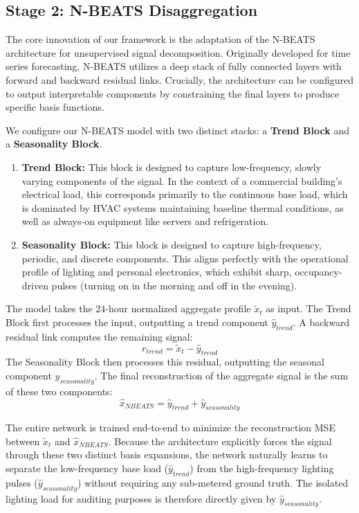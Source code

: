\subsection{Stage 2: N-BEATS Disaggregation}
The core innovation of our framework is the adaptation of the N-BEATS architecture \cite{nbeats_2020} for unsupervised signal decomposition. Originally developed for time series forecasting, N-BEATS utilizes a deep stack of fully connected layers with forward and backward residual links. Crucially, the architecture can be configured to output interpretable components by constraining the final layers to produce specific basis functions.

We configure our N-BEATS model with two distinct stacks: a \textbf{Trend Block} and a \textbf{Seasonality Block}.
\begin{enumerate}
    \item \textbf{Trend Block:} This block is designed to capture low-frequency, slowly varying components of the signal. In the context of a commercial building's electrical load, this corresponds primarily to the continuous base load, which is dominated by HVAC systems maintaining baseline thermal conditions, as well as always-on equipment like servers and refrigeration.
    \item \textbf{Seasonality Block:} This block is designed to capture high-frequency, periodic, and discrete components. This aligns perfectly with the operational profile of lighting and personal electronics, which exhibit sharp, occupancy-driven pulses (turning on in the morning and off in the evening).
\end{enumerate}

The model takes the 24-hour normalized aggregate profile $\tilde{x}_t$ as input. The Trend Block first processes the input, outputting a trend component $\hat{y}_{trend}$. A backward residual link computes the remaining signal:
\begin{equation}
    r_{trend} = \tilde{x}_t - \hat{y}_{trend}
\end{equation}
The Seasonality Block then processes this residual, outputting the seasonal component $\hat{y}_{seasonality}$. The final reconstruction of the aggregate signal is the sum of these two components:
\begin{equation}
    \hat{x}_{NBEATS} = \hat{y}_{trend} + \hat{y}_{seasonality}
\end{equation}

The entire network is trained end-to-end to minimize the reconstruction MSE between $\tilde{x}_t$ and $\hat{x}_{NBEATS}$. Because the architecture explicitly forces the signal through these two distinct basis expansions, the network naturally learns to separate the low-frequency base load ($\hat{y}_{trend}$) from the high-frequency lighting pulses ($\hat{y}_{seasonality}$) without requiring any sub-metered ground truth. The isolated lighting load for auditing purposes is therefore directly given by $\hat{y}_{seasonality}$.
